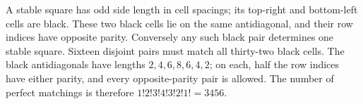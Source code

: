 A stable square has odd side length in cell spacings; its top-right and bottom-left cells are black. These two black cells lie on the same antidiagonal, and their row indices have opposite parity. Conversely any such black pair determines one stable square. Sixteen disjoint pairs must match all thirty-two black cells. The black antidiagonals have lengths $2,4,6,8,6,4,2$; on each, half the row indices have either parity, and every opposite-parity pair is allowed. The number of perfect matchings is therefore $1!2!3!4!3!2!1!=\boxed{3456}$.
